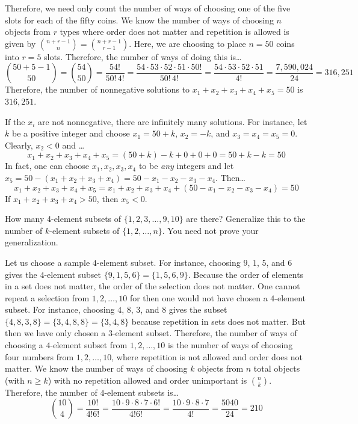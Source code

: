 \documentclass[11pt,letterpaper]{article}
\begin{document}
Therefore, we need only count the number of ways of choosing one of the five slots for each of the fifty coins. We know the number of ways of choosing $n$ objects from $r$ types where order does not matter and repetition is allowed is given by $\binom{n + r - 1}{n}= \binom{n + r - 1}{r - 1}$. Here, we are choosing to place $n= 50$ coins into $r= 5$ slots. Therefore, the number of ways of doing this is\dots
	\[
	\binom{50 + 5 - 1}{50}= \binom{54}{50}= \dfrac{54!}{50! \, 4!}= \dfrac{54 \cdot 53 \cdot 52 \cdot 51 \cdot 50!}{50! \, 4!}= \dfrac{54 \cdot 53 \cdot 52 \cdot 51}{4!}= \dfrac{7,\!590,\!024}{24}= 316,\!251
	\]
Therefore, the number of nonnegative solutions to $x_1 + x_2 + x_3 + x_4 + x_5= 50$ is $316,\!251$. \pspace

If the $x_i$ are not nonnegative, there are infinitely many solutions. For instance, let $k$ be a positive integer and choose $x_1= 50 + k$, $x_2= -k$, and $x_3= x_4= x_5= 0$. Clearly, $x_2 < 0$ and \dots
	\[
	x_1 + x_2 + x_3 + x_4 + x_5= (50 + k) - k + 0 + 0 + 0= 50 + k - k= 50
	\]
In fact, one can choose $x_1, x_2, x_3, x_4$ to be \textit{any} integers and let $x_5= 50 - (x_1 + x_2 + x_3 + x_4)= 50 - x_1 - x_2 - x_3 - x_4$. Then\dots
	\[
	x_1 + x_2 + x_3 + x_4 + x_5= x_1 + x_2 + x_3 + x_4 + (50 - x_1 - x_2 - x_3 - x_4)= 50
	\]
If $x_1 + x_2 + x_3 + x_4 > 50$, then $x_5 < 0$. 



\newpage



 How many 4-element subsets of $\{ 1, 2, 3, \ldots, 9, 10 \}$ are there? Generalize this to the number of $k$-element subsets of $\{ 1, 2, \ldots, n \}$. You need not prove your generalization. \pspace

\sol Let us choose a sample $4$-element subset. For instance, choosing $9$, $1$, $5$, and $6$ gives the $4$-element subset $\{ 9, 1, 5, 6 \}= \{ 1, 5, 6, 9 \}$. Because the order of elements in a set does not matter, the order of the selection does not matter. One cannot repeat a selection from $1, 2, \ldots, 10$ for then one would not have chosen a $4$-element subset. For instance, choosing $4$, $8$, $3$, and $8$ gives the subset $\{ 4, 8, 3, 8 \}= \{ 3, 4, 8, 8 \}= \{ 3, 4, 8 \}$ because repetition in sets does not matter. But then we have only chosen a $3$-element subset. Therefore, the number of ways of choosing a $4$-element subset from $1, 2, \ldots, 10$ is the number of ways of choosing four numbers from $1, 2, \ldots, 10$, where repetition is not allowed and order does not matter. We know the number of ways of choosing $k$ objects from $n$ total objects (with $n \geq k$) with no repetition allowed and order unimportant is $\binom{n}{k}$. Therefore, the number of $4$-element subsets is\dots
	\[
	\binom{10}{4}= \dfrac{10!}{4! 6!}= \dfrac{10 \cdot 9 \cdot 8 \cdot 7 \cdot 6!}{4! 6!}= \dfrac{10 \cdot 9 \cdot 8 \cdot 7}{4!}= \dfrac{5040}{24}= 210
	\] \pspace
\end{document}

